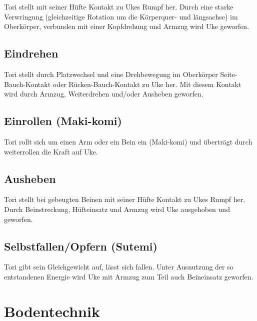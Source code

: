 \documentclass[justified, a4paper, notitlepage, captions=tableheading, nobib]{tufte-handout}
\begin{document}
Tori stellt mit seiner Hüfte Kontakt zu Ukes Rumpf her. Durch eine starke Verwringung (gleichzeitige
Rotation um die Körperquer- und längsachse) im Oberkörper, verbunden mit einer Kopfdrehung und
Armzug wird Uke geworfen.

\subsection{Eindrehen}
\label{sec:org97cdf7f}

Tori stellt durch Platzwechsel und eine Drehbewegung im Oberkörper Seite-Bauch-Kontakt oder
Rücken-Bauch-Kontakt zu Uke her. Mit diesem Kontakt wird durch Armzug, Weiterdrehen und/oder
Ausheben geworfen.

\subsection{Einrollen (Maki-komi)}
\label{sec:org383bde5}

Tori rollt sich um einen Arm oder ein Bein ein (Maki-komi) und überträgt durch weiterrollen die Kraft
auf Uke.

\subsection{Ausheben}
\label{sec:orgb2c87ea}

Tori stellt bei gebeugten Beinen mit seiner Hüfte Kontakt zu Ukes Rumpf her. Durch Beinstreckung,
Hüfteinsatz und Armzug wird Uke ausgehoben und geworfen.

\subsection{Selbstfallen/Opfern (Sutemi)}
\label{sec:orgd8130a1}

Tori gibt sein Gleichgewicht auf, lässt sich fallen. Unter Ausnutzung der so entstandenen Energie
wird Uke mit Armzug zum Teil auch Beineinsatz geworfen.


\newpage
\section{Bodentechnik }
\label{sec:org0068814}
\end{document}
